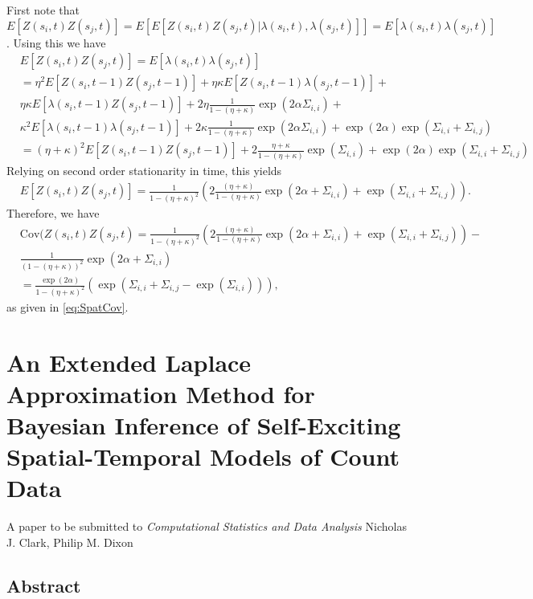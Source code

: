 \documentclass[11pt]{isuthesis}
\begin{document}
First note that $E[Z(s_i,t)Z(s_j,t)]=E[E[Z(s_i,t)Z(s_j,t)|\lambda(s_i,t),\lambda(s_j,t)]]=E[\lambda(s_i,t)\lambda(s_j,t)]$.  Using this we have
\begin{align}
	& E[Z(s_i,t)Z(s_j,t)]=E[\lambda(s_i,t)\lambda(s_j,t)]\\
	& = \eta^2 E[Z(s_i,t-1)Z(s_j,t-1)] + \eta \kappa E[Z(s_i,t-1)\lambda(s_j,t-1)]+\nonumber\\
	& \eta \kappa E[\lambda(s_i,t-1)Z(s_j,t-1)]+2\eta \frac{1}{1-(\eta+\kappa)}\exp(2\alpha \Sigma_{i,i})+\nonumber \\
	&\kappa^2 E[\lambda(s_i,t-1)\lambda(s_j,t-1)]+2 \kappa \frac{1}{1-(\eta+\kappa)}\exp(2\alpha \Sigma_{i,i})+\exp(2\alpha)\exp(\Sigma_{i,i}+\Sigma_{i,j})\\
	& = (\eta+\kappa)^2 E[Z(s_i,t-1)Z(s_j,t-1)]+2\frac{\eta+\kappa}{1-(\eta+\kappa)}\exp(\Sigma_{i,i})+\exp(2\alpha)\exp(\Sigma_{i,i}+\Sigma_{i,j})
\end{align}
Relying on second order stationarity in time, this yields
\begin{align}
	& E[Z(s_i,t)Z(s_j,t)] = \frac{1}{1-(\eta+\kappa)^2}\left(2\frac{(\eta+\kappa)}{1-(\eta+\kappa)}\exp(2\alpha+\Sigma_{i,i})+\exp(\Sigma_{i,i}+\Sigma_{i,j})\right).
\end{align}
Therefore, we have
\begin{align}
	& \mbox{Cov} (Z(s_i,t)Z(s_j,t)=\frac{1}{1-(\eta+\kappa)^2}\left(2\frac{(\eta+\kappa)}{1-(\eta+\kappa)}\exp(2\alpha+\Sigma_{i,i})+\exp(\Sigma_{i,i}+\Sigma_{i,j})\right) -\nonumber\\ & \frac{1}{(1-(\eta+\kappa))^2}\exp(2\alpha + \Sigma_{i,i})\\
	&=\frac{\exp(2\alpha)}{1-(\eta+\kappa)^2}\left(\exp(\Sigma_{i,i}+\Sigma_{i,j}-\exp(\Sigma_{i,i}))\right),
\end{align}
as given in \eqref{eq:SpatCov}.


	\chapter{An Extended Laplace Approximation Method for Bayesian Inference of Self-Exciting Spatial-Temporal Models of Count Data}\label{CSDA}
	\begin{center}
		A paper to be submitted to \textit{Computational Statistics and Data Analysis}\newline
		Nicholas J. Clark, Philip M. Dixon
	\end{center}
	\section*{Abstract}
	
\end{document}
